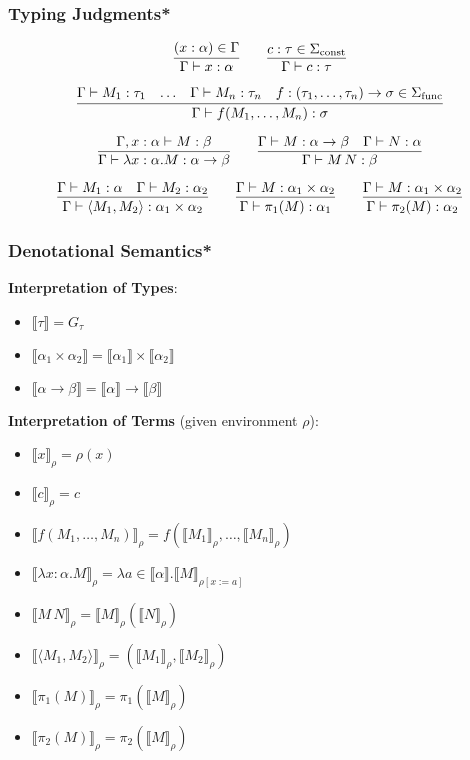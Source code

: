 \documentclass[aspectratio=169]{beamer}
\begin{document}
\begin{frame}
\frametitle{Typing Judgments*}

\[
\infer{\Gamma \vdash x : \alpha}{(x : \alpha) \in \Gamma}
\qquad\infer{\Gamma \vdash c : \tau}{c : \tau \in \Sigma_{\text{const}}}
\]

\[
\infer{\Gamma \vdash f(M_1, \ldots, M_n) : \sigma}{\Gamma \vdash M_1 : \tau_1 & \ldots & \Gamma \vdash M_n : \tau_n & f : (\tau_1, \ldots, \tau_n) \rightarrow \sigma \in \Sigma_{\text{func}}}
\]

\[
\infer{\Gamma \vdash \lambda x : \alpha. M : \alpha \rightarrow \beta}{\Gamma, x : \alpha \vdash M : \beta}
\qquad
\infer{\Gamma \vdash M \, N : \beta}{\Gamma \vdash M : \alpha \rightarrow \beta & \Gamma \vdash N : \alpha}
\]

\[
\infer{\Gamma \vdash \langle M_1, M_2 \rangle : \alpha_1 \times \alpha_2}{\Gamma \vdash M_1 : \alpha & \Gamma \vdash M_2 : \alpha_2}
\qquad
\infer{\Gamma \vdash \pi_1(M) : \alpha_1}{\Gamma \vdash M : \alpha_1 \times \alpha_2}
\qquad
\infer{\Gamma \vdash \pi_2(M) : \alpha_2}{\Gamma \vdash M : \alpha_1 \times \alpha_2}
\]
\end{frame}

\begin{frame}
\frametitle{Denotational Semantics*}

\textbf{Interpretation of Types}:

\begin{itemize}
    \item $\llbracket \tau \rrbracket = G_\tau$
    \item $\llbracket \alpha_1 \times \alpha_2 \rrbracket = \llbracket \alpha_1 \rrbracket \times \llbracket \alpha_2 \rrbracket$
    \item $\llbracket \alpha \rightarrow \beta \rrbracket = \llbracket \alpha \rrbracket \rightarrow \llbracket \beta \rrbracket$
\end{itemize}

\textbf{Interpretation of Terms} (given environment $\rho$):
\begin{itemize}
    \item $\llbracket x \rrbracket_\rho = \rho(x)$
    \item $\llbracket c \rrbracket_\rho = c$
    \item $\llbracket f(M_1, \ldots, M_n) \rrbracket_\rho = f(\llbracket M_1 \rrbracket_\rho, \ldots, \llbracket M_n \rrbracket_\rho)$
    \item $\llbracket \lambda x : \alpha. M \rrbracket_\rho = \lambda a \in \llbracket \alpha \rrbracket. \llbracket M \rrbracket_{\rho[x := a]}$
    \item $\llbracket M \, N \rrbracket_\rho = \llbracket M \rrbracket_\rho (\llbracket N \rrbracket_\rho)$
    \item $\llbracket \langle M_1, M_2 \rangle \rrbracket_\rho = (\llbracket M_1 \rrbracket_\rho, \llbracket M_2 \rrbracket_\rho)$
    \item $\llbracket \pi_1(M) \rrbracket_\rho = \pi_1(\llbracket M \rrbracket_\rho)$
    \item $\llbracket \pi_2(M) \rrbracket_\rho = \pi_2(\llbracket M \rrbracket_\rho)$
\end{itemize}
\end{frame}
\end{document}
